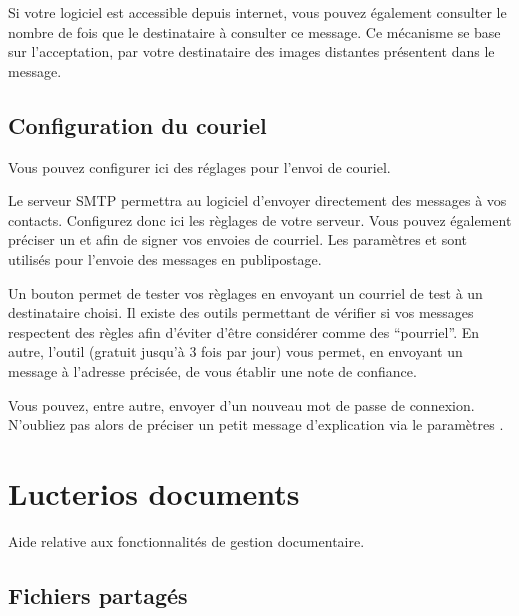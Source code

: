 \documentclass[a4paper,10pt,oneside,french]{sphinxmanual}
\begin{document}
Si votre logiciel est accessible depuis internet, vous pouvez également consulter le nombre de fois que le destinataire à consulter ce message.
Ce mécanisme se base sur l’acceptation, par votre destinataire des images distantes présentent dans le message.

\noindent{}


\section{Configuration du couriel}
\label{\detokenize{mailing/configuration:configuration-du-couriel}}\label{\detokenize{mailing/configuration::doc}}
Vous pouvez configurer ici des réglages pour l’envoi de couriel.

Le serveur SMTP permettra au logiciel d’envoyer directement des messages à vos contacts.
Configurez donc ici les règlages de votre serveur.
Vous pouvez également préciser un  et  afin de signer vos envoies de courriel.
Les paramètres  et  sont utilisés pour l’envoie des messages en publipostage.

Un bouton  permet de tester vos règlages en envoyant un courriel de test à un destinataire choisi.
Il existe des outils permettant de vérifier si vos messages respectent des règles afin d’éviter d’être considérer comme des “pourriel”.
En autre, l’outil  (gratuit jusqu’à 3 fois par jour) vous permet, en envoyant un message à l’adresse précisée, de vous établir une note de confiance.

Vous pouvez, entre autre, envoyer d’un nouveau mot de passe de connexion.
N’oubliez pas alors de préciser un petit message d’explication via le paramètres .


\chapter{Lucterios documents}
\label{\detokenize{documents/index:lucterios-documents}}\label{\detokenize{documents/index::doc}}
Aide relative aux fonctionnalités de gestion documentaire.


\section{Fichiers partagés}
\label{\detokenize{documents/shared_document:fichiers-partages}}\label{\detokenize{documents/shared_document::doc}}
\end{document}
